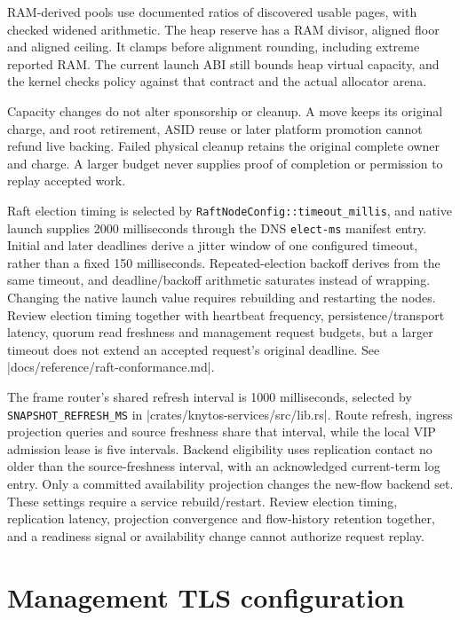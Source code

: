 RAM-derived pools use documented ratios of discovered usable pages, with
checked widened arithmetic. The heap reserve has a RAM divisor, aligned floor
and aligned ceiling. It clamps before alignment rounding, including extreme
reported RAM. The current launch ABI still bounds heap virtual capacity, and the
kernel checks policy against that contract and the actual allocator arena.

Capacity changes do not alter sponsorship or cleanup. A move keeps its original
charge, and root retirement, ASID reuse or later platform promotion cannot refund
live backing. Failed physical cleanup retains the original complete owner and
charge. A larger budget never supplies proof of completion or permission to
replay accepted work.

Raft election timing is selected by
\texttt{RaftNodeConfig::timeout\_millis}, and native launch supplies 2000 milliseconds
through the DNS \texttt{elect-ms} manifest entry. Initial and later
deadlines derive a jitter window of one configured timeout, rather than a fixed
150 milliseconds. Repeated-election backoff derives from the same timeout, and
deadline/backoff arithmetic saturates instead of wrapping. Changing the native
launch value requires rebuilding and restarting the nodes. Review election
timing together with heartbeat frequency, persistence/transport latency, quorum
read freshness and management request budgets, but a larger timeout does not extend
an accepted request's original deadline. See
\repofile|docs/reference/raft-conformance.md|.

The frame router's shared refresh interval is 1000 milliseconds, selected by
\texttt{SNAPSHOT\_REFRESH\_MS} in
\repofile|crates/knytos-services/src/lib.rs|. Route refresh, ingress projection
queries and source freshness share that interval, while the local VIP admission lease
is five intervals. Backend eligibility uses replication contact no older than
the source-freshness interval, with an acknowledged current-term log entry.
Only a committed availability projection changes the new-flow backend set.
These settings require a service rebuild/restart. Review election timing,
replication latency, projection convergence and flow-history retention together, and
a readiness signal or availability change cannot authorize request replay.

\section{Management TLS configuration}

